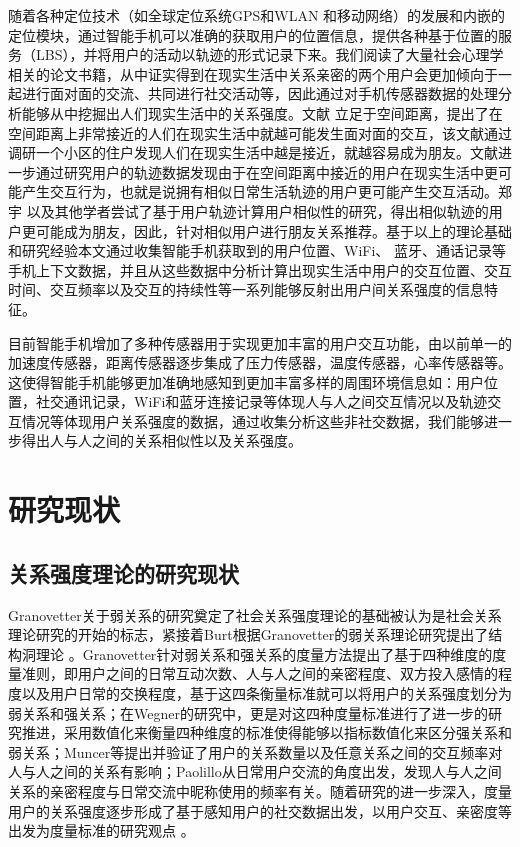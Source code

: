 \par 随着各种定位技术（如全球定位系统GPS和WLAN 和移动网络）的发展和内嵌的定位模块，通过智能手机可以准确的获取用户的位置信息，提供各种基于位置的服务（LBS），并将用户的活动以轨迹的形式记录下来。我们阅读了大量社会心理学相关的论文书籍，从中证实得到在现实生活中关系亲密的两个用户会更加倾向于一起进行面对面的交流、共同进行社交活动等，因此通过对手机传感器数据的处理分析能够从中挖掘出人们现实生活中的关系强度。文献\cite{zillmann2013selective} 立足于空间距离，提出了在空间距离上非常接近的人们在现实生活中就越可能发生面对面的交互，该文献通过调研一个小区的住户发现人们在现实生活中越是接近，就越容易成为朋友。文献\cite{zajonc1968attitudinal,zillmann2000mood}进一步通过研究用户的轨迹数据发现由于在空间距离中接近的用户在现实生活中更可能产生交互行为，也就是说拥有相似日常生活轨迹的用户更可能产生交互活动。郑宇 以及其他学者尝试了基于用户轨迹计算用户相似性的研究，得出相似轨迹的用户更可能成为朋友，因此，针对相似用户进行朋友关系推荐。基于以上的理论基础和研究经验本文通过收集智能手机获取到的用户位置、WiFi、 蓝牙、通话记录等手机上下文数据，并且从这些数据中分析计算出现实生活中用户的交互位置、交互时间、交互频率以及交互的持续性等一系列能够反射出用户间关系强度的信息特征。

\par 目前智能手机增加了多种传感器用于实现更加丰富的用户交互功能，由以前单一的加速度传感器，距离传感器逐步集成了压力传感器，温度传感器，心率传感器等。这使得智能手机能够更加准确地感知到更加丰富多样的周围环境信息如：用户位置，社交通讯记录，WiFi和蓝牙连接记录等体现人与人之间交互情况以及轨迹交互情况等体现用户关系强度的数据，通过收集分析这些非社交数据，我们能够进一步得出人与人之间的关系相似性以及关系强度。


\section{研究现状}
\subsection{关系强度理论的研究现状}
Granovetter关于弱关系的研究奠定了社会关系强度理论的基础被认为是社会关系理论研究的开始的标志，紧接着Burt根据Granovetter的弱关系理论研究提出了结构洞理论
。Granovetter针对弱关系和强关系的度量方法提出了基于四种维度的度量准则，即用户之间的日常互动次数、人与人之间的亲密程度、双方投入感情的程度以及用户日常的交换程度，基于这四条衡量标准就可以将用户的关系强度划分为弱关系和强关系；在Wegner的研究中，更是对这四种度量标准进行了进一步的研究推进，采用数值化来衡量四种维度的标准使得能够以指标数值化来区分强关系和弱关系；Muncer等提出并验证了用户的关系数量以及任意关系之间的交互频率对人与人之间的关系有影响；Paolillo从日常用户交流的角度出发，发现人与人之间关系的亲密程度与日常交流中昵称使用的频率有关。随着研究的进一步深入，度量用户的关系强度逐步形成了基于感知用户的社交数据出发，以用户交互、亲密度等出发为度量标准的研究观点
。
